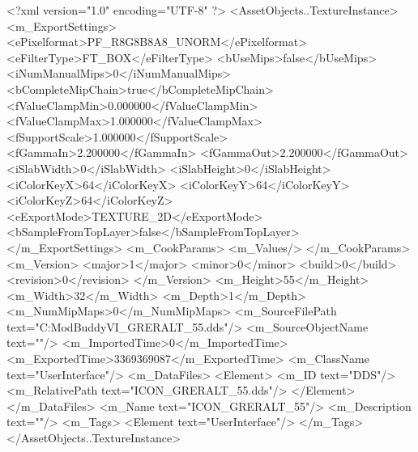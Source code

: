 <?xml version="1.0" encoding="UTF-8" ?>
<AssetObjects..TextureInstance>
	<m_ExportSettings>
		<ePixelformat>PF_R8G8B8A8_UNORM</ePixelformat>
		<eFilterType>FT_BOX</eFilterType>
		<bUseMips>false</bUseMips>
		<iNumManualMips>0</iNumManualMips>
		<bCompleteMipChain>true</bCompleteMipChain>
		<fValueClampMin>0.000000</fValueClampMin>
		<fValueClampMax>1.000000</fValueClampMax>
		<fSupportScale>1.000000</fSupportScale>
		<fGammaIn>2.200000</fGammaIn>
		<fGammaOut>2.200000</fGammaOut>
		<iSlabWidth>0</iSlabWidth>
		<iSlabHeight>0</iSlabHeight>
		<iColorKeyX>64</iColorKeyX>
		<iColorKeyY>64</iColorKeyY>
		<iColorKeyZ>64</iColorKeyZ>
		<eExportMode>TEXTURE_2D</eExportMode>
		<bSampleFromTopLayer>false</bSampleFromTopLayer>
	</m_ExportSettings>
	<m_CookParams>
		<m_Values/>
	</m_CookParams>
	<m_Version>
		<major>1</major>
		<minor>0</minor>
		<build>0</build>
		<revision>0</revision>
	</m_Version>
	<m_Height>55</m_Height>
	<m_Width>32</m_Width>
	<m_Depth>1</m_Depth>
	<m_NumMipMaps>0</m_NumMipMaps>
	<m_SourceFilePath text="C:\Users\asus\Documents\Firaxis ModBuddy\Civilization VI\temppic\ICON_GRERALT_55.dds"/>
	<m_SourceObjectName text=""/>
	<m_ImportedTime>0</m_ImportedTime>
	<m_ExportedTime>3369369087</m_ExportedTime>
	<m_ClassName text="UserInterface"/>
	<m_DataFiles>
		<Element>
			<m_ID text="DDS"/>
			<m_RelativePath text="ICON_GRERALT_55.dds"/>
		</Element>
	</m_DataFiles>
	<m_Name text="ICON_GRERALT_55"/>
	<m_Description text=""/>
	<m_Tags>
		<Element text="UserInterface"/>
	</m_Tags>
</AssetObjects..TextureInstance>

